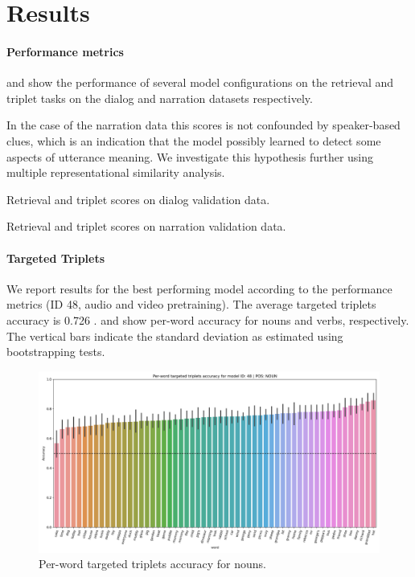 \section{Results}
\label{sec:results}
\paragraph{Performance metrics}
 and  show
the performance of several model configurations on the retrieval and
triplet tasks on the dialog and narration datasets respectively.

In the case of the narration data this scores is not confounded by
speaker-based clues, which is an indication that the model possibly
learned to detect some aspects of utterance meaning. We investigate
this hypothesis further using multiple representational similarity
analysis.
 

 \begin{table}
   \centering
   
   \caption{Retrieval and triplet scores on dialog validation data.}
   \label{tab:scores-dialog}
 \end{table}

\begin{table}
   \centering
   
   \caption{Retrieval and triplet scores on narration validation data.}
   \label{tab:scores-narration}
 \end{table}
 
\paragraph{Targeted Triplets}

We report results for the best performing model according to the performance metrics (ID 48, audio and video pretraining). The average targeted triplets accuracy is 0.726 .  and  show per-word accuracy for nouns and verbs, respectively. The vertical bars indicate the standard deviation as estimated using bootstrapping tests.


\begin{figure}
  \centering
  \includegraphics[width=\textwidth]{results_NOUN_word.png}
  \caption{Per-word targeted triplets accuracy for nouns.}
  \label{fig:accuracy_targeted_triplets_nouns}
\end{figure}

